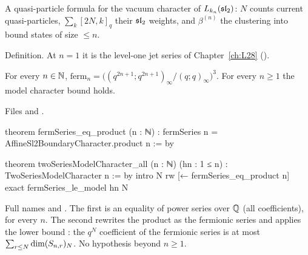 \begin{physics}
A quasi-particle formula for the vacuum character of $L_{k_n}(\mathfrak{sl}_2)$: $N$ counts current quasi-particles,
$\sum_k[2N,k]_q$ their $\mathfrak{sl}_2$ weights, and $\beta^{(n)}$ the clustering into bound states of size $\le n$.
\end{physics}

\begin{status}
Definition. At $n=1$ it is the level-one jet series of Chapter~\ref{ch:L28} ().
\end{status}

\begin{theorem}\label{l29:thm:modelchar}
For every $n\in{\mathbb{N}}$, $\mathrm{ferm}_n=\bigl((q^{2n+1};q^{2n+1})_\infty/(q;q)_\infty\bigr)^3$. For every $n\ge1$ the
model character bound holds.
\end{theorem}

\noindent Files  and
.
\begin{leancode}
theorem fermSeries_eq_product (n : ℕ) :
    fermSeries n = AffineSl2BoundaryCharacter.product n := by

theorem twoSeriesModelCharacter_all (n : ℕ) (hn : 1 ≤ n) : TwoSeriesModelCharacter n := by
  intro N
  rw [← fermSeries_eq_product n]
  exact fermSeries_le_model hn N
\end{leancode}

\begin{dictionary}
Full names  and .
The first is an equality of power series over ${\mathbb{Q}}$ (all coefficients), for every $n$. The second rewrites the product
as the fermionic series and applies the lower bound : the $q^N$ coefficient of the fermionic
series is at most $\sum_{r\le N}\dim(S_{n,r})_N$. No hypothesis beyond $n\ge1$.
\end{dictionary}

